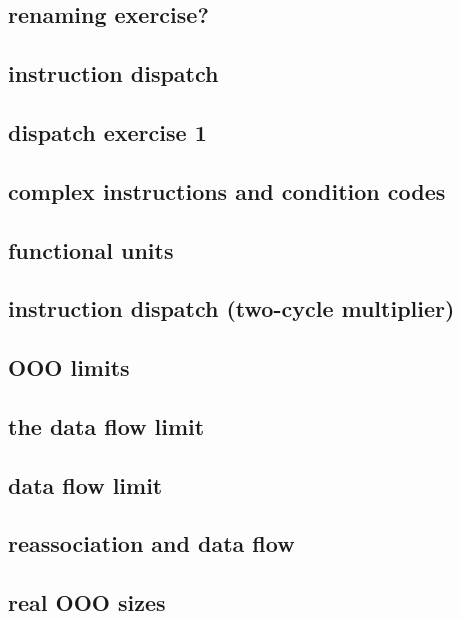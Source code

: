 

\subsection{renaming exercise?}


\subsection{instruction dispatch}


\subsection{dispatch exercise 1}


\subsection{complex instructions and condition codes}


\subsection{functional units}


\subsection{instruction dispatch (two-cycle multiplier)}



\subsection{OOO limits}


\subsection{the data flow limit}


\subsection{data flow limit}


\subsection{reassociation and data flow}




\subsection{real OOO sizes}


